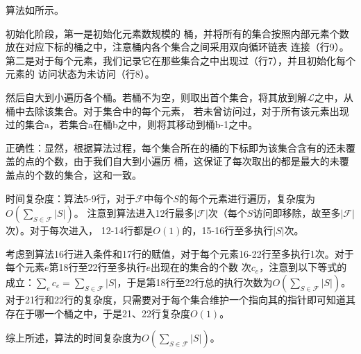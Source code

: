 \begin{solution}算法如所示。
    
    初始化阶段，第一是初始化元素数规模的
    桶，并将所有的集合按照内部元素个数放在对应下标的桶之中，注意桶内各个集合之间采用双向循环链表
    连接（行9）。第二是对于每个元素，我们记录它在那些集合之中出现过（行7），并且初始化每个元素的
    访问状态为未访问（行8）。

    然后自大到小遍历各个桶。若桶不为空，则取出首个集合，将其放到解$\mathcal{L}$之中，从桶中去除该集合。对于集合中的每个元素，
    若未曾访问过，对于所有该元素出现过的集合a，若集合a在桶b之中，则将其移动到桶b-1之中。

    正确性：显然，根据算法过程，每个集合所在的桶的下标即为该集合含有的还未覆盖的点的个数，由于我们自大到小遍历
    桶，这保证了每次取出的都是最大的未覆盖点的个数的集合，这和一致。

    时间复杂度：算法5-9行，对于$\mathcal{F}$中每个$S$的每个元素进行遍历，复杂度为$O(\sum_{S\in \mathcal{F}}|S|)$。
    注意到算法进入12行最多$|\mathcal{F}|$次（每个$S$访问即移除，故至多$|\mathcal{F}|$次）。对于每次进入，
    12-14行都是$O(1)$的，15-16行至多执行$|S|$次。

    考虑到算法16行进入条件和17行的赋值，对于每个元素16-22行至多执行1次。对于每个元素$e$第18行至22行至多执行$e$出现在的集合的个数
    次$c_e$，注意到以下等式的成立：$\sum_{e} c_e = \sum_{S\in \mathcal{F}} |S|$，于是第18行至22行总的执行次数为$O(\sum_{S\in \mathcal{F}} |S|)$。
    对于21行和22行的复杂度，只需要对于每个集合维护一个指向其的指针即可知道其存在于哪一个桶之中，于是21、22行复杂度$O(1)$。

    综上所述，算法的时间复杂度为$O(\sum_{S\in \mathcal{F}} |S|)$。
    
    \newcommand{\Doo}{\>\textbf{}\hspace*{-0.7em}\'\addtocounter{indent}{1}}
    

\end{solution}
